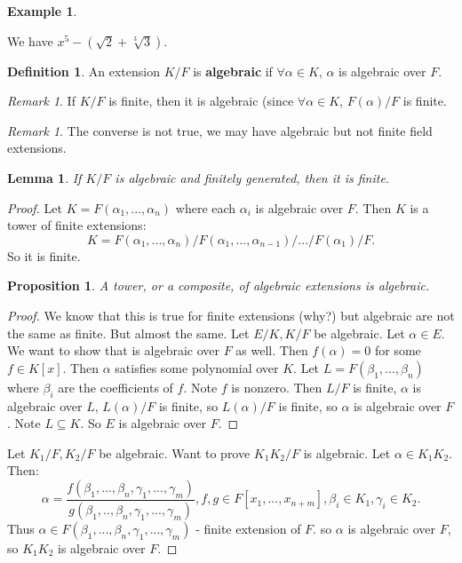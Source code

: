 \documentclass[9pt,reqno,twoside]{amsbook}
\theoremstyle{plain}
\numberwithin{section}{chapter}
\numberwithin{equation}{chapter}
\newtheorem{lem}[theorem]{Lemma}
\newtheorem{Prop}[theorem]{Proposition}
\theoremstyle{definition}
\newtheorem{Def}[theorem]{Definition}
\newtheorem{Ex}[theorem]{Example}
\theoremstyle{remark}
\newtheorem{rem}[theorem]{Remark}
\theoremstyle{plain}
\newcommand{\sub}{\subseteq}
\newcommand{\fracc}{\frac}
\begin{document}
\begin{Ex}
\begin{enumerate}
We have $x^5 - (\sqrt{2} + \sqrt[3]{3})$. 




\end{enumerate}
\end{Ex}

\begin{Def}
An extension $K/F$ is \textbf{algebraic} if $\forall \alpha \in K$, $\alpha$ is algebraic over $F$. 
\end{Def}

\begin{rem}
If $K/F$ is finite, then it is algebraic (since $\forall \alpha \in K$, $F(\alpha)/F$ is finite. 
\end{rem}

\begin{rem}
The converse is not true, we may have algebraic but not finite field extensions. 
\end{rem}

\begin{lem}
If $K/F$ is algebraic and finitely generated, then it is finite. 
\end{lem}

\begin{proof}
Let $K = F(\alpha_1,...,\alpha_n)$ where each $\alpha_i$ is algebraic over $F$. Then $K$ is a tower of finite extensions:
$$
K = F(\alpha_1,...,\alpha_n)/F(\alpha_1,...,\alpha_{n  -1})/.../F(\alpha_1)/F.
$$
So it is finite. 

\begin{Prop}
A tower, or a composite, of algebraic extensions is algebraic. 
\end{Prop}
\begin{proof}
We know that this is true for finite extensions (why?) but algebraic are not the same as finite. But almost the same. Let $E/K,K/F$ be algebraic. Let $\alpha \in E$. We want to show that is algebraic over $F$ as well. Then $f(\alpha) = 0$ for some $f \in K[x]$. Then $\alpha$ satisfies some polynomial over $K$. Let $L = F(\beta_1,...,\beta_n)$ where $\beta_i$ are the coefficients of $f$. Note $f$ is nonzero. Then $L/F$ is finite, $\alpha$ is algebraic over $L$, $L(\alpha)/F$ is finite, so $L(\alpha)/F$ is finite, so $\alpha$ is algebraic over $F$. Note $L\sub K$. So $E$ is algebraic over $F$. 
\end{proof}
Let $K_1/F,K_2/F$ be algebraic. Want to prove $K_1K_2/F$ is algebraic. Let $\alpha \in K_1K_2$. Then:
$$
\alpha = \fracc{f(\beta_1,...,\beta_n,\gamma_1,...,\gamma_m)}{g(\beta_1,..,\beta_n,\gamma_1,...,\gamma_m)}, f,g \in F[x_1,...,x_{n + m}],\beta_i \in K_1,\gamma_i \in K_2.
$$
Thus $\alpha \in F(\beta_1,...,\beta_n,\gamma_1,...,\gamma_m)$ - finite extension of $F$. so $\alpha$ is algebraic over $F$, so $K_1K_2$ is algebraic over $F$. 
\end{proof}
\end{document}
